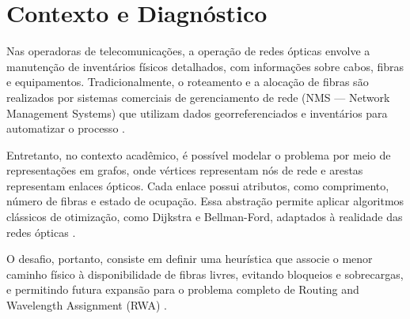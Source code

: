\section{Contexto e Diagnóstico} \label{sec:context}

Nas operadoras de telecomunicações, a operação de redes ópticas envolve a
manutenção de inventários físicos detalhados, com informações sobre cabos,
fibras e equipamentos. Tradicionalmente, o roteamento e a alocação de fibras
são realizados por sistemas comerciais de gerenciamento de rede (NMS — Network
Management Systems) que utilizam dados georreferenciados e inventários para
automatizar o processo \cite{livroprofessor}.

Entretanto, no contexto acadêmico, é possível modelar o problema por meio de
representações em grafos, onde vértices representam nós de rede e arestas
representam enlaces ópticos. Cada enlace possui atributos, como comprimento,
número de fibras e estado de ocupação. Essa abstração permite aplicar
algoritmos clássicos de otimização, como Dijkstra e Bellman-Ford, adaptados à
realidade das redes ópticas \cite{bazaraa2011linear}.

O desafio, portanto, consiste em definir uma heurística que associe o menor
caminho físico à disponibilidade de fibras livres, evitando bloqueios e
sobrecargas, e permitindo futura expansão para o problema completo de Routing
and Wavelength Assignment (RWA) \cite{artigorwa}.
